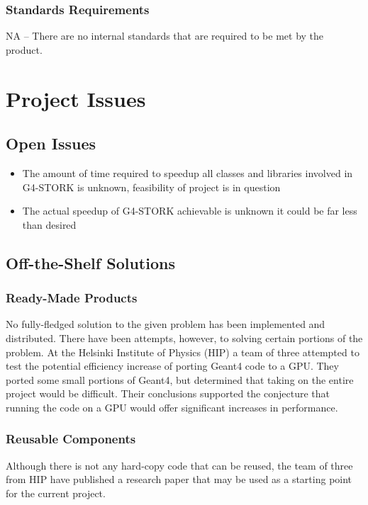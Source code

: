 \documentclass[12pt]{article}
\begin{document}
\subsubsection{Standards Requirements}
NA -- There are no internal standards that are required to be met by the product.

\section{Project Issues}

\subsection{Open Issues} %
\begin{itemize}
\item The amount of time required to speedup all classes and libraries involved in G4-STORK is unknown, feasibility of project is in question
\item The actual speedup of G4-STORK achievable is unknown it could be far less than desired
\end{itemize}

\subsection{Off-the-Shelf Solutions} %

\subsubsection{Ready-Made Products}
No fully-fledged solution to the given problem has been implemented and distributed. There have been attempts, however, to solving certain portions of the problem. At the Helsinki Institute of Physics (HIP) a team of three attempted to test the potential efficiency increase of porting Geant4 code to a GPU. They ported some small portions of Geant4, but determined that taking on the entire project would be difficult. Their conclusions supported the conjecture that running the code on a GPU would offer significant increases in performance.

\subsubsection{Reusable Components}
Although there is not any hard-copy code that can be reused, the team of three from HIP have published a research paper that may be used as a starting point for the current project.
	
\end{document}
